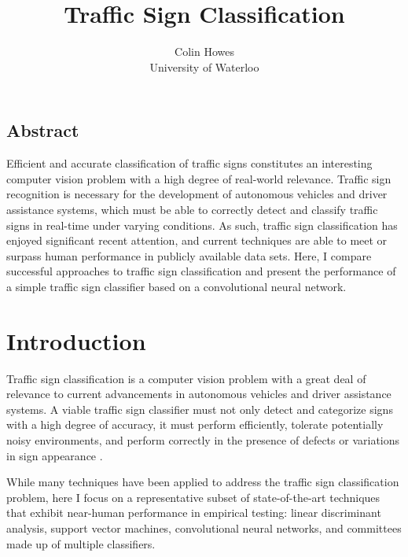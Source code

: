 \documentclass[letterpaper,twocolumn,10pt]{article}
\begin{document}
\date{}

\title{\Large \bf Traffic Sign Classification}

\author{
	{\rm Colin Howes}\\
	University of Waterloo
} %

\maketitle

\thispagestyle{empty}


\subsection*{Abstract}

Efficient and accurate classification of traffic signs constitutes an interesting computer vision problem with a high degree of real-world relevance. Traffic sign recognition is necessary for the development of autonomous vehicles and driver assistance systems, which must be able to correctly detect and classify traffic signs in real-time under varying conditions. As such, traffic sign classification has enjoyed significant recent attention, and current techniques are able to meet or surpass human performance in publicly available data sets. Here, I compare successful approaches to traffic sign classification and present the performance of a simple traffic sign classifier based on a convolutional neural network.


\section{Introduction}

Traffic sign classification is a computer vision problem with a great deal of relevance to current advancements in autonomous vehicles and driver assistance systems. A viable traffic sign classifier must not only detect and categorize signs with a high degree of accuracy, it must perform efficiently, tolerate potentially noisy environments, and perform correctly in the presence of defects or variations in sign appearance \cite{stallkamp_german_2011, stallkamp_man_2012}. 

While many techniques have been applied to address the traffic sign classification problem, here I focus on a representative subset of state-of-the-art techniques that exhibit near-human performance in empirical testing: linear discriminant analysis, support vector machines, convolutional neural networks, and committees made up of multiple classifiers.
\end{document}
